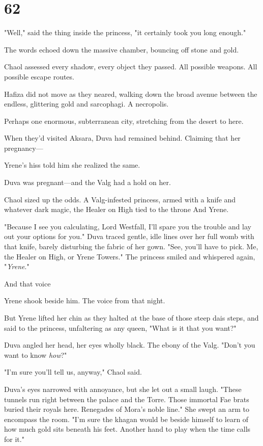 
\chapter{62}

"Well," said the thing inside the princess, "it certainly took you long enough."

The words echoed down the massive chamber, bouncing off stone and gold.

Chaol assessed every shadow, every object they passed. All possible weapons. All possible escape routes.

Hafiza did not move as they neared, walking down the broad avenue between the endless, glittering gold and sarcophagi. A necropolis.

Perhaps one enormous, subterranean city, stretching from the desert to here.

When they'd visited Aksara, Duva had remained behind. Claiming that her pregnancy---

Yrene's hiss told him she realized the same.

Duva was pregnant---and the Valg had a hold on her.

Chaol sized up the odds. A Valg-infested princess, armed with a knife and whatever dark magic, the Healer on High tied to the throne 
And Yrene.

"Because I see you calculating, Lord Westfall, I'll spare you the trouble and lay out your options for you." Duva traced gentle, idle lines over her full womb with that knife, barely disturbing the fabric of her gown. "See, you'll have to pick. Me, the Healer on High, or Yrene Towers." The princess smiled and whispered again, "\emph{Yrene}."

And that voice 

Yrene shook beside him. The voice from that night.

But Yrene lifted her chin as they halted at the base of those steep dais steps, and said to the princess, unfaltering as any queen, "What is it that you want?"

Duva angled her head, her eyes wholly black. The ebony of the Valg. "Don't you want to know \emph{how}?"

"I'm sure you'll tell us, anyway," Chaol said.

Duva's eyes narrowed with annoyance, but she let out a small laugh. "These tunnels run right between the palace and the Torre. Those immortal Fae brats buried their royals here. Renegades of Mora's noble line." She swept an arm to encompass the room. "I'm sure the khagan would be beside himself to learn of how much gold sits beneath his feet. Another hand to play when the time calls for it."

